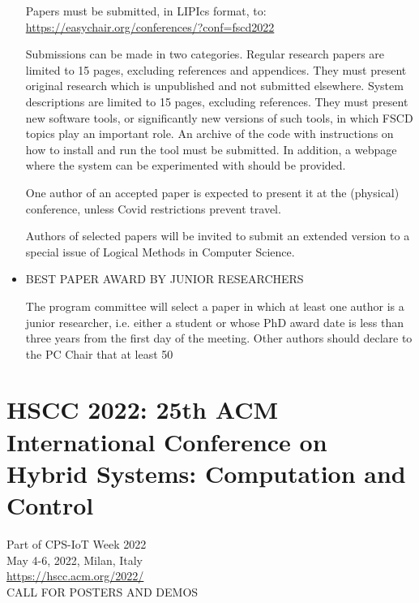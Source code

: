 \documentclass[prodmode,acmtecs]{acmsmall} %
\begin{document}
\begin{itemize}
  Papers must be submitted, in LIPIcs format, to: \href{https://easychair.org/conferences/?conf=fscd2022}{https://easychair.org/conferences/?conf=fscd2022} 
 
  Submissions can be made in two categories.  Regular research papers are limited to 15 pages, excluding references and appendices.  They must present original research which is unpublished and not submitted elsewhere.  System descriptions are limited to 15 pages, excluding references.  They must present new software tools, or significantly new versions of such tools, in which FSCD topics play an important role. An archive of the code with instructions on how to install and run the tool must be submitted.  In addition, a webpage where the system can be experimented with should be provided. 
 
  One author of an accepted paper is expected to present it at the (physical) conference, unless Covid restrictions prevent travel. 
 
  Authors of selected papers will be invited to submit an extended version to a special issue of Logical Methods in Computer Science. 
 
\item  BEST PAPER AWARD BY JUNIOR RESEARCHERS 
 
  The program committee will select a paper in which at least one author is a junior researcher, i.e. either a student or whose PhD award date is less than three years from the first day of the meeting. Other authors should declare to the PC Chair that at least 50%
 
\end{itemize}\section{HSCC 2022: 25th ACM International Conference on Hybrid Systems: Computation and Control}\label{HSCC2022}  Part of CPS-IoT Week 2022\\ 
  May 4-6, 2022, Milan, Italy\\ 
  \href{https://hscc.acm.org/2022/}{https://hscc.acm.org/2022/}\\ 
CALL FOR POSTERS AND DEMOS 
\end{document}
